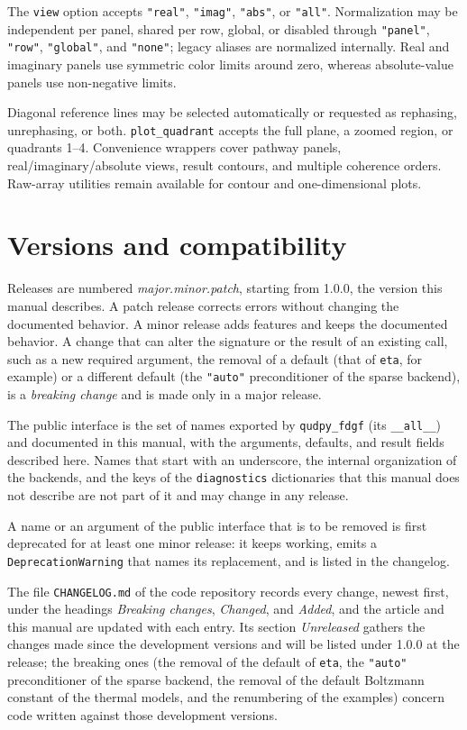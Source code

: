 \documentclass[11pt]{article}
\begin{document}
The \texttt{view} option accepts \texttt{"real"}, \texttt{"imag"}, \texttt{"abs"}, or \texttt{"all"}. Normalization may be independent per panel, shared per row, global, or disabled through \texttt{"panel"}, \texttt{"row"}, \texttt{"global"}, and \texttt{"none"}; legacy aliases are normalized internally. Real and imaginary panels use symmetric color limits around zero, whereas absolute-value panels use non-negative limits.

Diagonal reference lines may be selected automatically or requested as rephasing, unrephasing, or both. \texttt{plot\_quadrant} accepts the full plane, a zoomed region, or quadrants 1--4. Convenience wrappers cover pathway panels, real/imaginary/absolute views, result contours, and multiple coherence orders. Raw-array utilities remain available for contour and one-dimensional plots.

\section{Versions and compatibility}
\label{sec:versions}

Releases are numbered \emph{major.minor.patch}, starting from 1.0.0, the version this manual describes. A patch release corrects errors without changing the documented behavior. A minor release adds features and keeps the documented behavior. A change that can alter the signature or the result of an existing call, such as a new required argument, the removal of a default (that of \texttt{eta}, for example) or a different default (the \texttt{"auto"} preconditioner of the sparse backend), is a \emph{breaking change} and is made only in a major release.

The public interface is the set of names exported by \texttt{qudpy\_fdgf} (its \texttt{\_\_all\_\_}) and documented in this manual, with the arguments, defaults, and result fields described here. Names that start with an underscore, the internal organization of the backends, and the keys of the \texttt{diagnostics} dictionaries that this manual does not describe are not part of it and may change in any release.

A name or an argument of the public interface that is to be removed is first deprecated for at least one minor release: it keeps working, emits a \texttt{DeprecationWarning} that names its replacement, and is listed in the changelog.

The file \texttt{CHANGELOG.md} of the code repository records every change, newest first, under the headings \emph{Breaking changes}, \emph{Changed}, and \emph{Added}, and the article and this manual are updated with each entry. Its section \emph{Unreleased} gathers the changes made since the development versions and will be listed under 1.0.0 at the release; the breaking ones (the removal of the default of \texttt{eta}, the \texttt{"auto"} preconditioner of the sparse backend, the removal of the default Boltzmann constant of the thermal models, and the renumbering of the examples) concern code written against those development versions.
\end{document}

